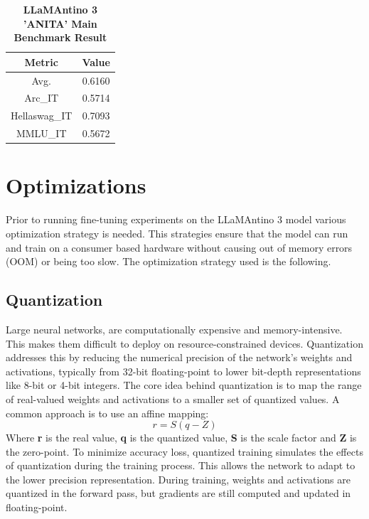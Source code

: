 \documentclass{article}
\begin{document}
	\begin{table}[h]
		\center
		\begin{tabular}{cc}
			\toprule
			\textbf{Metric} & \textbf{Value} \\
			\midrule
			Avg. & 0.6160 \\
			Arc\_IT & 0.5714 \\
			Hellaswag\_IT &	0.7093 \\
			MMLU\_IT & 0.5672 \\
			\bottomrule
		\end{tabular}
		\caption{\textbf{LLaMAntino 3 'ANITA' Main Benchmark Result}}
	\end{table}  

	\section{Optimizations}
	Prior to running fine-tuning experiments on the LLaMAntino 3 model various optimization strategy is needed. This strategies ensure that the model can run and train on a consumer based hardware without causing out of memory errors (OOM) or being too slow. 
	The optimization strategy used is the following.
	
	\subsection{Quantization}  
	Large neural networks, are computationally expensive and memory-intensive. This makes them difficult to deploy on resource-constrained devices. Quantization addresses this by reducing the numerical precision of the network's weights and activations, typically from 32-bit floating-point to lower bit-depth representations like 8-bit or 4-bit integers. The core idea behind quantization is to map the range of real-valued weights and activations to a smaller set of quantized values. A common approach is to use an affine mapping:
	\begin{equation}
		r=S(q-Z)
	\end{equation}
	Where \textbf{r} is the real value, \textbf{q} is the quantized value, \textbf{S} is the scale factor and \textbf{Z} is the zero-point. To minimize accuracy loss, quantized training simulates the effects of quantization during the training process. This allows the network to adapt to the lower precision representation. During training, weights and activations are quantized in the forward pass, but gradients are still computed and updated in floating-point.
	
\end{document}
